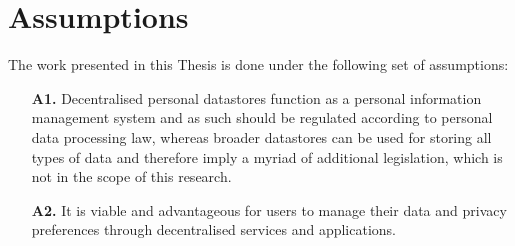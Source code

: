 \section{Assumptions}
\label{sec:assumptions}

The work presented in this Thesis is done under the following set of assumptions:

\begin{enumerate}
    \item [\textbf{A1.}] Decentralised personal datastores function as a personal information management system and as such should be regulated according to personal data processing law, whereas broader datastores can be used for storing all types of data and therefore imply a myriad of additional legislation, which is not in the scope of this research.
    \item [\textbf{A2.}] It is viable and advantageous for users to manage their data and privacy preferences through decentralised services and applications.
\end{enumerate}
